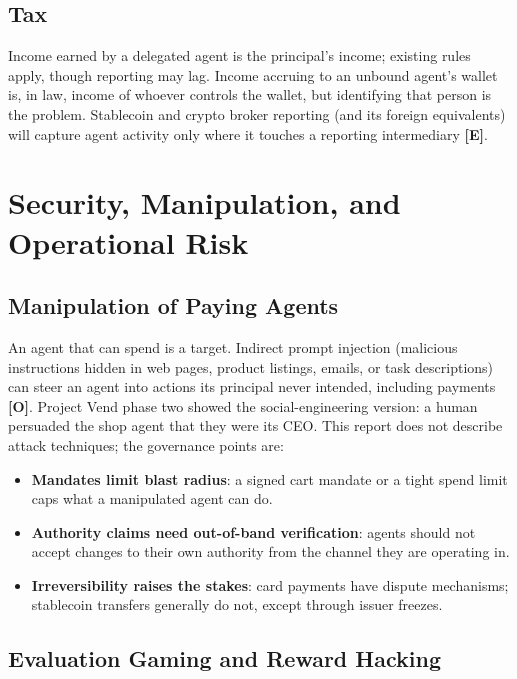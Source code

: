 \documentclass[11pt,letterpaper]{article}
\begin{document}
\subsection{Tax}

Income earned by a delegated agent is the principal's income; existing rules apply, though reporting may lag. Income accruing to an unbound agent's wallet is, in law, income of whoever controls the wallet, but identifying that person is the problem. Stablecoin and crypto broker reporting (and its foreign equivalents) will capture agent activity only where it touches a reporting intermediary \textbf{[E]}.

\section{Security, Manipulation, and Operational Risk}
\label{sec:security}

\subsection{Manipulation of Paying Agents}

An agent that can spend is a target. Indirect prompt injection (malicious instructions hidden in web pages, product listings, emails, or task descriptions) can steer an agent into actions its principal never intended, including payments \textbf{[O]}. Project Vend phase two showed the social-engineering version: a human persuaded the shop agent that they were its CEO. This report does not describe attack techniques; the governance points are:

\begin{itemize}
  \item \textbf{Mandates limit blast radius}: a signed cart mandate or a tight spend limit caps what a manipulated agent can do.
  \item \textbf{Authority claims need out-of-band verification}: agents should not accept changes to their own authority from the channel they are operating in.
  \item \textbf{Irreversibility raises the stakes}: card payments have dispute mechanisms; stablecoin transfers generally do not, except through issuer freezes.
\end{itemize}

\subsection{Evaluation Gaming and Reward Hacking}
\end{document}
